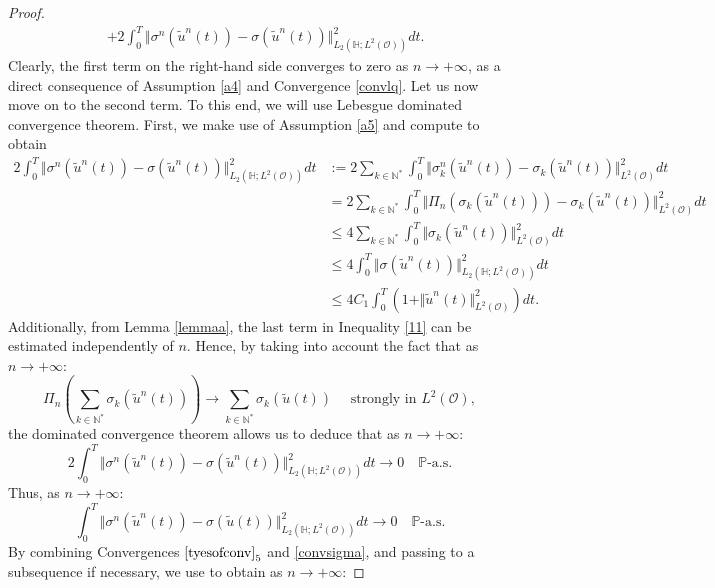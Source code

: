 \documentclass[10pt,number,preprint,times]{elsarticle}
\numberwithin{equation}{section} %
\begin{document}
\begin{proof}
\begin{align*}
	&+2\int_{0}^T \Vert \sigma^n(\tilde{u}^n(t))-\sigma(\tilde{u}^n(t)) \Vert_{{L}_2(\mathbb{H} ;L^2(\mathcal{O}))}^2dt.
\end{align*}
Clearly, the first term on the right-hand side converges to zero as $n \rightarrow +\infty$, as a  direct consequence of Assumption \ref{a4} and Convergence \eqref{convlq}. Let us now move on to the second term. To this end, we will use Lebesgue dominated convergence theorem. First, we make use of Assumption \ref{a5} and compute to obtain
\begin{align}\label{11}
		2\int_{0}^T \Vert \sigma^n(\tilde{u}^n(t))-\sigma(\tilde{u}^n(t)) \Vert_{{L}_2(\mathbb{H} ;L^2(\mathcal{O}))}^2dt&:=2 \sum_{k \in \mathbb{N}^*} \int_0^T \Vert\sigma_{k}^n (\tilde{u}^n(t))-\sigma_k(\tilde{u}^n(t))\Vert_{L^2(\mathcal{O})}^2 dt \nonumber\\
		&=2 \sum_{k \in \mathbb{N}^*} \int_0^T \Vert \Pi_n(\sigma_{k} (\tilde{u}^n(t)))-\sigma_k(\tilde{u}^n(t))\Vert_{L^2(\mathcal{O})}^2 dt\nonumber\\
		&\leq 4 \sum_{k \in \mathbb{N}^*} \int_0^T \Vert \sigma_k(\tilde{u}^n(t))\Vert_{L^2(\mathcal{O})}^2 dt \nonumber \\
		&\leq 4 \int_0^T \Vert \sigma(\tilde{u}^n(t))\Vert_{L_2(\mathbb{H};L^2(\mathcal{O}))}^2 dt\nonumber\nonumber \\
		&\leq 4C_1 \int_0^T \left(1+\Vert \tilde{u}^n(t)\Vert_{L^2(\mathcal{O})}^2 \right) dt.
\end{align}
Additionally, from Lemma \ref{lemmaa}, the last term in Inequality \eqref{11} can be estimated independently of $n$. Hence, by taking into account the fact that as $n \rightarrow +\infty$:
$$
\Pi_n\left(\sum_{k \in \mathbb{N}^*} \sigma_{k}(\tilde{u}^n(t))\right) \rightarrow \sum_{k \in \mathbb{N}^*} \sigma_{k}(\tilde{u}(t)) \quad \text{ strongly in } L^2(\mathcal{O}),
$$
the dominated convergence theorem allows us to deduce that as $n \rightarrow +\infty$:
$$
2\int_{0}^T \Vert \sigma^n(\tilde{u}^n(t))-\sigma(\tilde{u}^n(t)) \Vert_{{L}_2(\mathbb{H} ;L^2(\mathcal{O}))}^2dt \rightarrow 0 \quad \mathbb{P}\text{-a.s}.
$$
Thus, as $n \rightarrow +\infty$:
\begin{equation}\label{convsigma}
	\int_{0}^T \Vert \sigma^n(\tilde{u}^n(t))-\sigma(\tilde{u}(t)) \Vert_{{L}_2(\mathbb{H} ;L^2(\mathcal{O}))}^2 dt  \rightarrow 0 \quad \mathbb{P}\text{-a.s}.
\end{equation}
By combining Convergences $\eqref{tyesofconv}_5$ and \eqref{convsigma}, and passing to a subsequence if necessary, we use \cite[Lemma 2.1]{debussche2011local} to obtain as $n \rightarrow +\infty$:

\end{proof}
\end{document}
